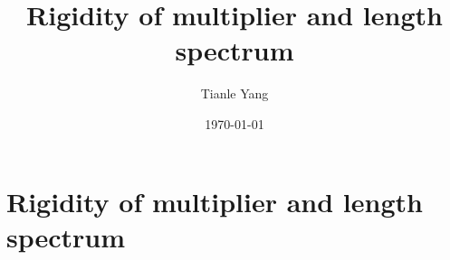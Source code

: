 \documentclass[sectionlevel=section,status=draft]{noteformyself}
\title{Rigidity of multiplier and length spectrum}
\author{Tianle Yang}
\date{\today}
\begin{document}
\maketitle

    \section[
      status=draft,
      tag=00000,
      label=\labelNFM{sec:endomorphisms-on-projective-spaces:rigidity-of-multiplier-and-length-spectrum}
    ]{Rigidity of multiplier and length spectrum}



\end{document}
